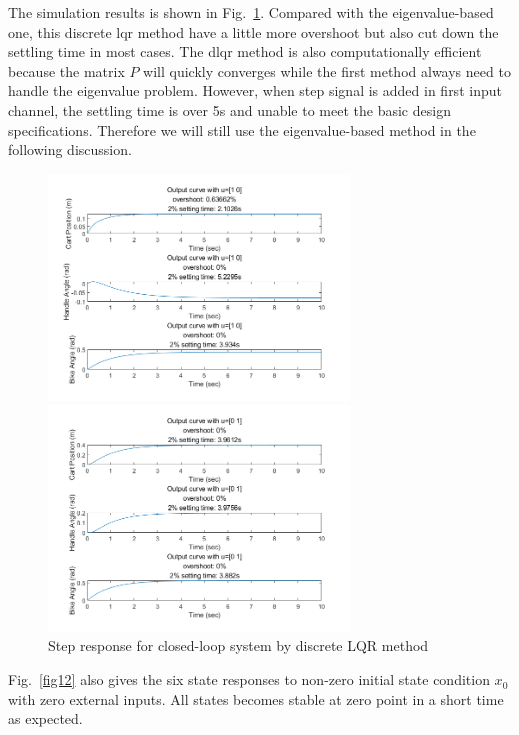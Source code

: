 \documentclass[hyperref]{article}
\theoremstyle{nonumberplain}
\begin{document}
	The simulation results is shown in Fig.~\ref{fig11}. Compared with the eigenvalue-based one, this discrete lqr method have a little more overshoot but also cut down the settling time in most cases. The dlqr method is also computationally efficient because the matrix $P$ will quickly converges while the first method always need to handle the eigenvalue problem. However, when step signal is added in first input channel, the settling time is over 5s and unable to meet the basic design specifications. Therefore we will still use the eigenvalue-based method in the following discussion.
	
	\begin{figure}[htbp]
		\centering
		\begin{minipage}[t]{0.48\textwidth}
			\centering
			\includegraphics[width=8cm]{fig15.png}
		\end{minipage}
		\begin{minipage}[t]{0.48\textwidth}
			\centering
			\includegraphics[width=8cm]{fig14.png}
		\end{minipage}
		\caption{Step response for closed-loop system by discrete LQR method}
		\label{fig11}
	\end{figure}

	Fig.~\ref{fig12} also gives the six state responses to non-zero initial state condition $x_{0}$ with zero external inputs. All states becomes stable at zero point in a short time as expected.
	
\end{document}
